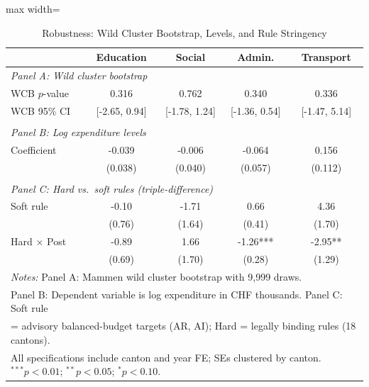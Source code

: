 \begin{table}[htbp]
\centering
\caption{Robustness: Wild Cluster Bootstrap, Levels, and Rule Stringency}
\label{tab:robust}
\begin{adjustbox}{max width=\textwidth}
\begin{tabular}{lcccc}
\hline\hline
 & Education & Social & Admin. & Transport \\
\hline
\multicolumn{5}{l}{\textit{Panel A: Wild cluster bootstrap}} \\
WCB $p$-value & 0.316 & 0.762 & 0.340 & 0.336 \\
WCB 95\% CI & [-2.65, 0.94] & [-1.78, 1.24] & [-1.36, 0.54] & [-1.47, 5.14] \\
 & & & & \\
\multicolumn{5}{l}{\textit{Panel B: Log expenditure levels}} \\
Coefficient & -0.039 & -0.006 & -0.064 & 0.156 \\
 & (0.038) & (0.040) & (0.057) & (0.112) \\
 & & & & \\
\multicolumn{5}{l}{\textit{Panel C: Hard vs.\ soft rules (triple-difference)}} \\
Soft rule & -0.10 & -1.71 & 0.66 & 4.36 \\
 & (0.76) & (1.64) & (0.41) & (1.70) \\
Hard $\times$ Post & -0.89 & 1.66 & -1.26*** & -2.95** \\
 & (0.69) & (1.70) & (0.28) & (1.29) \\
\hline
\multicolumn{5}{l}{\footnotesize \textit{Notes:} Panel A: Mammen wild cluster bootstrap with 9,999 draws.} \\
\multicolumn{5}{l}{\footnotesize Panel B: Dependent variable is log expenditure in CHF thousands. Panel C: Soft rule} \\
\multicolumn{5}{l}{\footnotesize = advisory balanced-budget targets (AR, AI); Hard = legally binding rules (18 cantons).} \\
\multicolumn{5}{l}{\footnotesize All specifications include canton and year FE; SEs clustered by canton. $^{***}p<0.01$; $^{**}p<0.05$; $^{*}p<0.10$.} \\
\hline\hline
\end{tabular}
\end{adjustbox}
\end{table}
